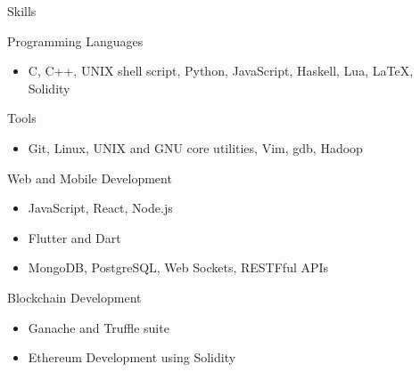 \documentclass{article}
\newlength{\tabin}
\newlength{\secsep}
\newcommand{\lineunder}{\vspace*{-8pt} \\ \hspace*{-6pt} \hrulefill \\ \vspace*{-15pt}}
\newenvironment{tabbedsection}[1]{
	\begin{list}{}{
		\setlength{\itemsep}{0pt}
		\setlength{\labelsep}{0pt}
		\setlength{\labelwidth}{0pt}
		\setlength{\leftmargin}{\tabin}
		\setlength{\rightmargin}{\tabin}
		\setlength{\listparindent}{0pt}
		\setlength{\parsep}{0pt}
		\setlength{\parskip}{0pt}
		\setlength{\partopsep}{0pt}
		\setlength{\topsep}{#1}
	}
	\item[]
}{\end{list}}
\newenvironment{resume_section}[1]{
	\filbreak
	\vspace{2\secsep}
	\textsc{\large#1}
	\lineunder
	\begin{tabbedsection}{\secsep}
}{\end{tabbedsection}}
\newenvironment{resume_subsection}[2][]{
	\textbf{#2} \hfill {\footnotesize #1} \hspace{2em}
	\begin{tabbedsection}{0.5\secsep}
}{\end{tabbedsection}}
\newenvironment{subitems}{
	\renewcommand{\labelitemi}{-}
	\begin{itemize}
		\setlength{\labelsep}{1em}
}{\end{itemize}}
\begin{document}
\begin{resume_section}{Skills}

	\begin{resume_subsection}{Programming Languages}
		\begin{subitems}
		\item C, C++, UNIX shell script, Python, JavaScript, Haskell, Lua, {\LaTeX}, Solidity
		\end{subitems}
	\end{resume_subsection}

	\begin{resume_subsection}{Tools}
		\begin{subitems}
		\item Git, Linux, UNIX and GNU core utilities, Vim, gdb, Hadoop
		\end{subitems}
	\end{resume_subsection}

	\begin{resume_subsection}{Web and Mobile Development}
		\begin{subitems}
		\item JavaScript, React, Node.js
		\item Flutter and Dart
		\item MongoDB, PostgreSQL, Web Sockets, RESTFful APIs
		\end{subitems}
	\end{resume_subsection}

	\begin{resume_subsection}{Blockchain Development}
		\begin{subitems}
		\item Ganache and Truffle suite
		\item Ethereum Development using Solidity
		\end{subitems}
	\end{resume_subsection}

\end{resume_section}
\end{document}
